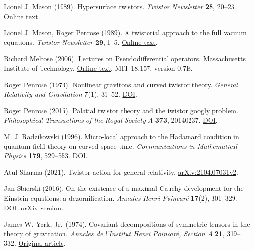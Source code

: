 \documentclass[
  english,
  11pt,
  reqno]{amsart}
\begin{document}
\begin{thebibliography}{}
\leavevmode{}\label{ref-Mason1989}Lionel J. Mason (1989). Hypersurface twistors. \emph{Twistor Newsletter}
\textbf{28}, 20--23.
\href{https://people.maths.ox.ac.uk/lmason/Tn/28/TN28-06.pdf}{Online
text}.

\leavevmode{}\label{ref-MasonPenrose1989}Lionel J. Mason, Roger Penrose (1989). A twistorial approach to the full
vacuum equations. \emph{Twistor Newsletter} \textbf{29}, 1--5.
\href{https://people.maths.ox.ac.uk/lmason/Tn/29/TN29-02.pdf}{Online
text}.

\leavevmode{}\label{ref-Melrose2006}Richard Melrose (2006). Lectures on Pseudodifferential operators.
Massachusetts Institute of Technology.
\href{https://math.mit.edu/~rbm/18.157-F05.pdf}{Online text}. MIT
18.157, version 0.7E.

\leavevmode{}\label{ref-Penrose1976}Roger Penrose (1976). Nonlinear gravitons and curved twistor theory.
\emph{General Relativity and Gravitation} \textbf{7}(1), 31--52.
\href{https://doi.org/10.1007/BF00762011}{DOI}.

\leavevmode{}\label{ref-Penrose2015}Roger Penrose (2015). Palatial twistor theory and the twistor googly
problem. \emph{Philosophical Transactions of the Royal Society A}
\textbf{373}, 20140237.
\href{https://doi.org/10.1098/rsta.2014.0237}{DOI}.

\leavevmode{}\label{ref-Radzikowski1996}M. J. Radzikowski (1996). Micro-local approach to the Hadamard condition
in quantum field theory on curved space-time. \emph{Communications in
Mathematical Physics} \textbf{179}, 529--553.
\href{https://doi.org/10.1007/BF02100096}{DOI}.

\leavevmode{}\label{ref-Sharma2021}Atul Sharma (2021). Twistor action for general relativity.
\href{https://arxiv.org/abs/2104.07031v2}{arXiv:2104.07031v2}.

\leavevmode{}\label{ref-Sbierski2016}Jan Sbierski (2016). On the existence of a maximal Cauchy development
for the Einstein equations: a dezornification. \emph{Annales Henri
Poincaré} \textbf{17}(2), 301--329.
\href{https://doi.org/10.1007/s00023-015-0401-5}{DOI}.
\href{https://arxiv.org/abs/1309.7591v3}{arXiv version}.

\leavevmode{}\label{ref-York1974}James W. York, Jr.~(1974). Covariant decompositions of symmetric tensors
in the theory of gravitation. \emph{Annales de l'Institut Henri
Poincaré, Section A} \textbf{21}, 319--332.
\href{https://www.numdam.org/item/AIHPA_1974__21_4_319_0/}{Original
article}.

\end{thebibliography}
\endgroup
\end{document}

